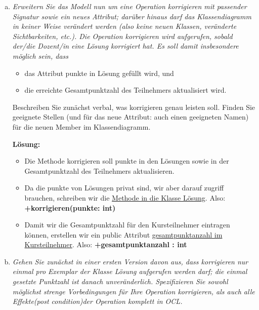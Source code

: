     
\begin{enumerate}[(a)]
    \item {\itshape Erweitern Sie das Modell nun um eine Operation korrigieren mit passender Signatur sowie  ein  neues  Attribut;  darüber  hinaus  darf das  Klassendiagramm  in  keiner  Weise verändert werden (also keine neuen Klassen, veränderte Sichtbarkeiten, etc.). Die Operation korrigieren wird aufgerufen, sobald der/die Dozent/in eine Lösung korrigiert hat.
    Es soll damit insbesondere möglich sein, dass
    \begin{itemize}
        \item das Attribut punkte in Lösung gefüllt wird, und
        \item die erreichte Gesamtpunktzahl des Teilnehmers aktualisiert wird.
    \end{itemize}
    Beschreiben Sie zunächst verbal, was korrigieren genau leisten soll. Finden Sie geeignete  Stellen  (und  für  das  neue  Attribut:  auch  einen  geeigneten  Namen)  für  die neuen Member im Klassendiagramm.
    }
    
    \textbf{Lösung:}
    \begin{itemize}
        \item Die Methode korrigieren soll punkte in den Lösungen sowie in der Gesamtpunktzahl des Teilnehmers aktualisieren. 
        \item Da die punkte von Lösungen privat sind, wir aber darauf zugriff brauchen, schreiben wir die \underline{Methode in die Klasse Lösung}. Also: \textbf{+korrigieren(punkte: int)}
        \item Damit wir die Gesamtpunktzahl für den Kursteilnehmer eintragen können, erstellen wir ein public Attribut \underline{gesamtpunktanzahl im Kursteilnehmer}. Also: \textbf{+gesamtpunktanzahl : int}
    \end{itemize}
    
    \item {\itshape Gehen Sie zunächst in einer ersten Version davon aus, dass korrigieren nur einmal pro Exemplar der Klasse Lösung aufgerufen werden darf; die einmal gesetzte Punktzahl ist danach unveränderlich. Spezifizieren Sie sowohl möglichst strenge Vorbedingungen für Ihre Operation korrigieren, als auch alle Effekte(post condition)der Operation komplett in OCL.}
    

\end{enumerate}
